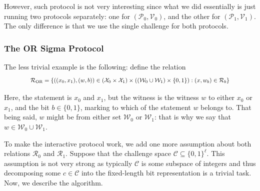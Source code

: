 \documentclass[../lecture-notes-148x210.tex]{subfiles}
\begin{document}
However, such protocol is not very interesting since what we did essentially is just running two protocols separately: one for $(\mathcal{P}_0,\mathcal{V}_0)$, and the other for $(\mathcal{P}_1,\mathcal{V}_1)$. The only difference is that we use the single challenge for both protocols.

\subsubsection{The OR Sigma Protocol}

The less trivial example is the following: define the relation
\begin{equation*}
    \scalebox{0.85}{$
    \mathcal{R}_{\text{OR}} = \left\{ ((x_0, x_1), (w, b)) \in (\mathcal{X}_0 \times \mathcal{X}_1) \times ((\mathcal{W}_0 \cup \mathcal{W}_1) \times \{0,1\}): (x, w_b) \in \mathcal{R}_b \right\}
    $}
\end{equation*}

Here, the statement is $x_0$ and $x_1$, but the witness is the witness $w$ to either $x_0$ or $x_1$, and the bit $b \in \{0,1\}$, marking to which of the statement $w$ belongs to. That being said, $w$ might be from either set $\mathcal{W}_0$ or $\mathcal{W}_1$: that is why we say that $w \in \mathcal{W}_0 \cup \mathcal{W}_1$.

To make the interactive protocol work, we add one more assumption about both relations $\mathcal{R}_0$ and $\mathcal{R}_1$. Suppose that the challenge space $\mathcal{C} \subseteq \{0,1\}^{\ell}$. This assumption is not very strong as typically $\mathcal{C}$ is some subspace of integers and thus decomposing some $c \in \mathcal{C}$ into the fixed-length bit representation is a trivial task.
Now, we describe the algorithm.

\vspace{-2mm}
\end{document}
